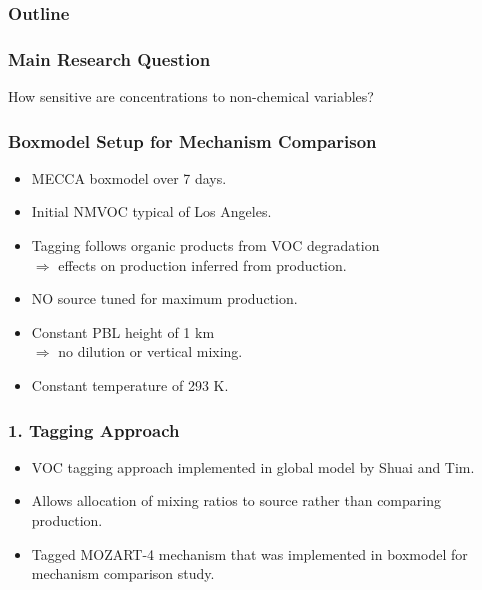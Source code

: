 \begin{frame}
    \frametitle{Outline} 
    \tableofcontents[currentsection]
\end{frame} 

\begin{frame}
    \frametitle{Main Research Question} 

    \vspace{-0.7cm}
    \begin{center}
        \LARGE{How sensitive are  concentrations to non-chemical variables?}
    \end{center}
\end{frame}

\begin{frame}
    \frametitle{Boxmodel Setup for Mechanism Comparison}

    \vspace{-0.5cm}
    \begin{itemize}
        \item MECCA boxmodel over 7 days. \vspace{2mm}
        \item Initial NMVOC typical of Los Angeles. \vspace{2mm}
        \item Tagging follows organic products from VOC degradation \\ \hspace{2mm}$\Rightarrow$ effects on  production inferred from  production. \vspace{2mm}
        \item NO source tuned for maximum  production. \vspace{2mm}
        \item Constant PBL height of 1 km \\ \hspace{2mm}$\Rightarrow$ no dilution or vertical mixing. \vspace{2mm}
        \item Constant temperature of 293 K.
    \end{itemize}
\end{frame}

\begin{frame}
    \frametitle{1. Tagging Approach}

    \vspace{-5mm}
    \begin{itemize}
        \item VOC tagging approach implemented in global model by Shuai and Tim. \vspace{3mm}
        \item Allows allocation of  mixing ratios to source rather than comparing  production. \vspace{3mm}
        \item Tagged MOZART-4 mechanism that was implemented in boxmodel for mechanism comparison study.
    \end{itemize}
\end{frame}

